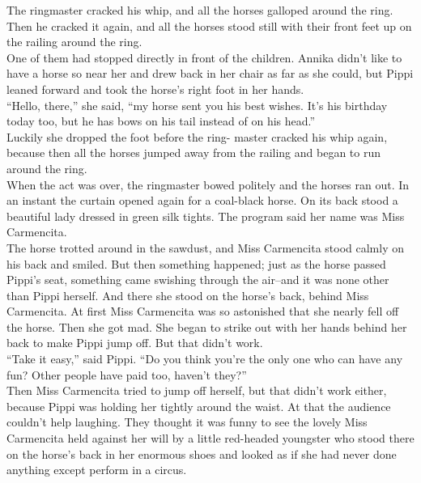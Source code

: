 \documentclass{standard}
\begin{document}
The ringmaster cracked his whip, and all the horses galloped around the ring. Then he cracked it again, and all the horses stood still with their front feet up on the railing around the ring.\\

One of them had stopped directly in front of the children. Annika didn’t like to have a horse so near her and drew back in her chair as far as she could, but Pippi leaned forward and took the horse’s right foot in her hands.\\

“Hello, there,” she said, “my horse sent you his best wishes. It’s his birthday today too, but he has bows on his tail instead of on his head.”\\

Luckily she dropped the foot before the ring- master cracked his whip again, because then all the horses jumped away from the railing and began to run around the ring.\\

When the act was over, the ringmaster bowed politely and the horses ran out. In an instant the curtain opened again for a coal-black horse. On its back stood a beautiful lady dressed in green silk tights. The program said her name was Miss Carmencita.\\

The horse trotted around in the sawdust, and Miss Carmencita stood calmly on his back and smiled. But then something happened; just as the horse passed Pippi’s seat, something came swishing through the air--and it was none other than Pippi herself. And there she stood on the horse’s back, behind Miss Carmencita. At first Miss Carmencita was so astonished that she nearly fell off the horse. Then she got mad. She began to strike out with her hands behind her back to make Pippi jump off. But that didn’t work.\\

“Take it easy,” said Pippi. “Do you think you’re the only one who can have any fun? Other people have paid too, haven’t they?”\\

Then Miss Carmencita tried to jump off herself, but that didn’t work either, because Pippi was holding her tightly around the waist. At that the audience couldn’t help laughing. They thought it was funny to see the lovely Miss Carmencita held against her will by a little red-headed youngster who stood there on the horse’s back in her enormous shoes and looked as if she had never done anything except perform in a circus.\\
\end{document}
